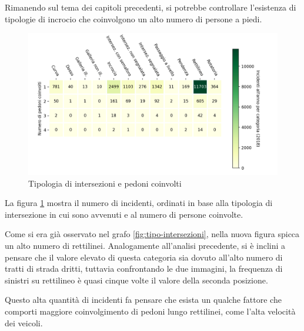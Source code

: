 \documentclass[a4paper,12pt]{report}
\begin{document}
Rimanendo sul tema dei capitoli precedenti, 
si potrebbe controllare l'esistenza di tipologie di incrocio che 
coinvolgono un alto numero di persone a piedi. 

\begin{figure}
    \includegraphics[width=\linewidth]{../src/incidenti/incidenti_senza_coords/pedoni/pedoni_incroci.png}
    \caption{Tipologia di intersezioni e pedoni coinvolti}
    \label{fig:pedoni-intersezioni}
\end{figure}

La figura \ref{fig:pedoni-intersezioni} mostra il numero di incidenti, 
ordinati in base alla tipologia di intersezione in cui sono avvenuti 
e al numero di persone coinvolte. 

Come si era già osservato nel grafo \ref{fig:tipo-intersezioni}, nella nuova 
figura spicca un alto numero di rettilinei. 
Analogamente all'analisi precedente, si è inclini a pensare che il valore 
elevato di questa categoria sia dovuto all'alto 
numero di tratti di strada dritti, tuttavia confrontando le due immagini, 
la frequenza di sinistri su rettilineo è quasi cinque 
volte il valore della seconda posizione. 

Questo alta quantità di incidenti fa pensare che esista un qualche fattore 
che comporti maggiore coinvolgimento di pedoni lungo rettilinei, come 
l'alta velocità dei veicoli. 
\end{document}
